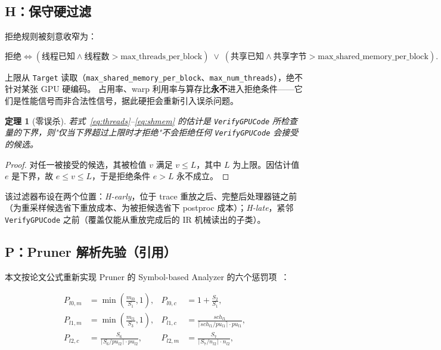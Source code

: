 \documentclass[UTF8]{ctexart}
\newtheorem{theorem}{定理}
\begin{document}
\subsection{H：保守硬过滤}

拒绝规则被刻意收窄为：

\begin{equation}
\text{拒绝} \iff (\text{线程已知} \land \text{线程数} > \text{max\_threads\_per\_block})
\;\lor\; (\text{共享已知} \land \text{共享字节} > \text{max\_shared\_memory\_per\_block}).
\label{eq:hard}
\end{equation}

上限从 \texttt{Target} 读取（\texttt{max\_shared\_memory\_per\_block}、\texttt{max\_num\_threads}），绝不针对某张 GPU 硬编码。
占用率、warp 利用率与算存比\textbf{永不}进入拒绝条件——它们是性能信号而非合法性信号，据此硬拒会重新引入误杀问题。

\begin{theorem}[零误杀]
若式~\eqref{eq:threads}--\eqref{eq:shmem} 的估计是 \texttt{VerifyGPUCode} 所检查量的下界，则"仅当下界超过上限时才拒绝"不会拒绝任何 \texttt{VerifyGPUCode} 会接受的候选。
\end{theorem}

\begin{proof}
对任一被接受的候选，其被检值 $v$ 满足 $v \le L$，其中 $L$ 为上限。因估计值 $e$ 是下界，故 $e \le v \le L$，于是拒绝条件 $e > L$ 永不成立。
\end{proof}

该过滤器布设在两个位置：\emph{H-early}，位于 trace 重放之后、完整后处理器链之前（为重采样候选省下重放成本、为被拒候选省下 postproc 成本）；\emph{H-late}，紧邻 \texttt{VerifyGPUCode} 之前（覆盖仅能从重放完成后的 IR 机械读出的子类）。

\subsection{P：Pruner 解析先验（引用）}

本文按论文公式重新实现 Pruner 的 Symbol-based Analyzer 的六个惩罚项~\cite{pruner}：

\begin{align}
P_{l0,m} &= \min\left(\frac{m_{l0}}{S_1}, 1\right), & P_{l0,c} &= 1 + \frac{S_2}{S_1}, \\
P_{l1,m} &= \min\left(\frac{m_{l1}}{S_3}, 1\right), & P_{l1,c} &= \frac{sch_{l1}}{\lceil sch_{l1}/pu_{l1}\rceil \cdot pu_{l1}}, \\
P_{l2,c} &= \frac{S_6}{\lceil S_6/pu_{l2}\rceil \cdot pu_{l2}}, & P_{l2,m} &= \frac{S_7}{\lceil S_7/n_{l2}\rceil \cdot n_{l2}},
\end{align}
\end{document}
